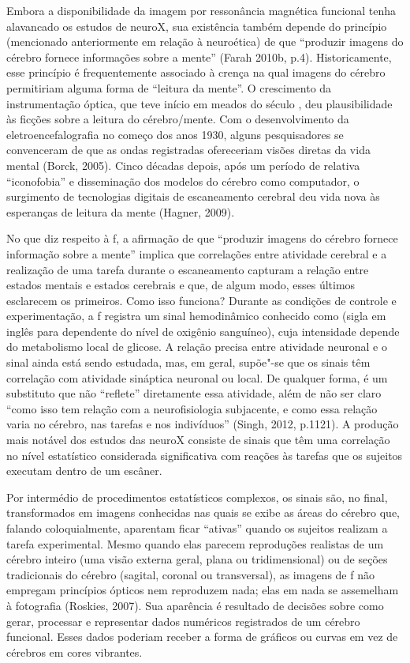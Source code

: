 Embora a disponibilidade da imagem por ressonância magnética funcional
tenha alavancado os estudos de neuroX, sua existência também depende do
princípio (mencionado anteriormente em relação à neuroética) de que
``produzir imagens do cérebro fornece informações sobre a mente'' (Farah
2010b, p.4). Historicamente, esse princípio é frequentemente associado à
crença na qual imagens do cérebro permitiriam alguma forma de ``leitura
da mente''. O crescimento da instrumentação óptica, que teve início em
meados do século , deu plausibilidade às ficções sobre a leitura do
cérebro/mente. Com o desenvolvimento da eletroencefalografia no começo
dos anos 1930, alguns pesquisadores se convenceram de que as ondas
registradas ofereceriam visões diretas da vida mental (Borck, 2005).
Cinco décadas depois, após um período de relativa ``iconofobia'' e
disseminação dos modelos do cérebro como computador, o surgimento de
tecnologias digitais de escaneamento cerebral deu vida nova às
esperanças de leitura da mente (Hagner, 2009).

No que diz respeito à f, a afirmação de que ``produzir imagens do
cérebro fornece informação sobre a mente'' implica que correlações entre
atividade cerebral e a realização de uma tarefa durante o escaneamento
capturam a relação entre estados mentais e estados cerebrais e que, de
algum modo, esses últimos esclarecem os primeiros. Como isso funciona?
Durante as condições de controle e experimentação, a f registra um
sinal hemodinâmico conhecido como  (sigla em inglês para dependente
do nível de oxigênio sanguíneo), cuja intensidade depende do metabolismo
local de glicose. A relação precisa entre atividade neuronal e o sinal
 ainda está sendo estudada, mas, em geral, supõe"-se que os sinais
têm correlação com atividade sináptica neuronal ou local. De qualquer
forma, é um substituto que não ``reflete'' diretamente essa atividade,
além de não ser claro ``como isso tem relação com a neurofisiologia
subjacente, e como essa relação varia no cérebro, nas tarefas e nos
indivíduos'' (Singh, 2012, p.1121). A produção mais notável dos estudos
das neuroX consiste de sinais  que têm uma correlação no nível
estatístico considerada significativa com reações às tarefas que os
sujeitos executam dentro de um escâner.

Por intermédio de procedimentos estatísticos complexos, os sinais são,
no final, transformados em imagens conhecidas nas quais se exibe as
áreas do cérebro que, falando coloquialmente, aparentam ficar ``ativas''
quando os sujeitos realizam a tarefa experimental. Mesmo quando elas
parecem reproduções realistas de um cérebro inteiro (uma visão externa
geral, plana ou tridimensional) ou de seções tradicionais do cérebro
(sagital, coronal ou transversal), as imagens de f não empregam
princípios ópticos nem reproduzem nada; elas em nada se assemelham à
fotografia (Roskies, 2007). Sua aparência é resultado de decisões sobre
como gerar, processar e representar dados numéricos registrados de um
cérebro funcional. Esses dados poderiam receber a forma de gráficos ou
curvas em vez de cérebros em cores vibrantes.

